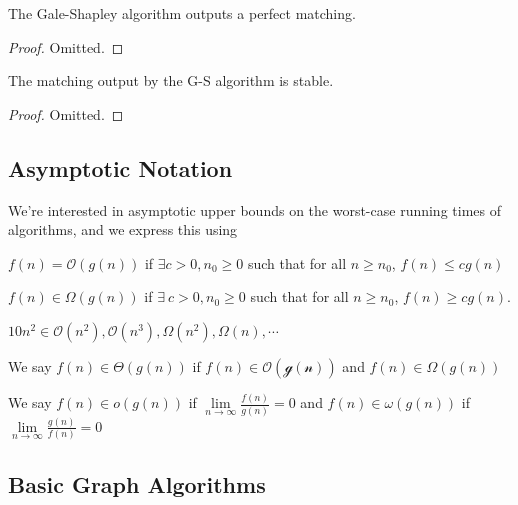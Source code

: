 \documentclass[12pt]{scrartcl}
\begin{document}
\begin{lemma}
  The Gale-Shapley algorithm outputs a perfect matching. 
  \begin{proof}
    Omitted. 
  \end{proof}
\end{lemma}

\begin{theorem}
  The matching output by the G-S algorithm is stable. 
  \begin{proof}
    Omitted.
  \end{proof}
\end{theorem}

\subsection{Asymptotic Notation}

We're interested in asymptotic upper bounds on the worst-case running times of algorithms, 
and we express this using 

\begin{definition}
  $f(n) = \mathcal{O}(g(n))$ if $\exists c > 0, n_0 \geq 0$ such that for all $n \geq n_0$, 
  $f(n) \leq cg(n)$
\end{definition}

\begin{definition}
  $f(n) \in \Omega(g(n))$ if $\exists \ c > 0, n_0 \geq 0$ such that for all $n \geq n_0$, $f(n) \geq cg(n)$. 
\end{definition}

\begin{example}
  $10n^2 \in \mathcal{O}(n^2), \mathcal{O}(n^3), \Omega(n^2), \Omega(n), \cdots$
\end{example}

\begin{definition}
  We say $f(n) \in \Theta(g(n))$ if $f(n) \in \mathcal{O(g(n))}$ and $f(n) \in \Omega(g(n))$
\end{definition}

\begin{definition}
  We say $f(n) \in o(g(n))$ if $\underset{n\to\infty}{\lim}\frac{f(n)}{g(n)} = 0$ and 
  $f(n) \in \omega(g(n))$ if $\underset{n\to\infty}{\lim}\frac{g(n)}{f(n)} = 0$
\end{definition}

\subsection{Basic Graph Algorithms}
\end{document}
